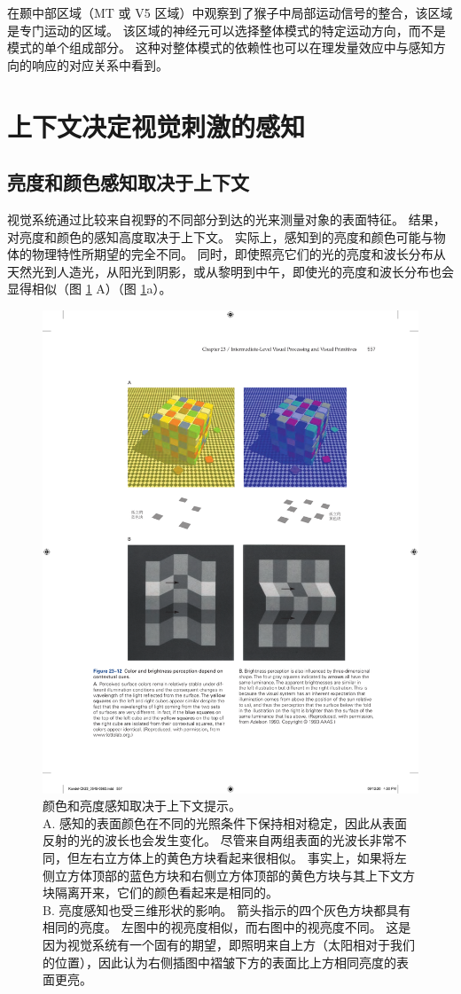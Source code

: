 在颞中部区域（MT 或 V5 区域）中观察到了猴子中局部运动信号的整合，该区域是专门运动的区域。
该区域的神经元可以选择整体模式的特定运动方向，而不是模式的单个组成部分。
这种对整体模式的依赖性也可以在理发量效应中与感知方向的响应的对应关系中看到。



\section{上下文决定视觉刺激的感知}

\subsection{亮度和颜色感知取决于上下文}

视觉系统通过比较来自视野的不同部分到达的光来测量对象的表面特征。
结果，对亮度和颜色的感知高度取决于上下文。 
实际上，感知到的亮度和颜色可能与物体的物理特性所期望的完全不同。
同时，即使照亮它们的光的亮度和波长分布从天然光到人造光，从阳光到阴影，或从黎明到中午，即使光的亮度和波长分布也会显得相似（图 \ref{fig:23_12} A）（图 \ref{fig:23_12}a）。

\begin{figure}[htbp]
	\centering
	\includegraphics[width=0.7\linewidth]{chap23/fig_23_12}
	\caption{颜色和亮度感知取决于上下文提示。\protect\\
		A. 感知的表面颜色在不同的光照条件下保持相对稳定，因此从表面反射的光的波长也会发生变化。
		尽管来自两组表面的光波长非常不同，但左右立方体上的黄色方块看起来很相似。
		事实上，如果将左侧立方体顶部的蓝色方块和右侧立方体顶部的黄色方块与其上下文方块隔离开来，它们的颜色看起来是相同的。\protect\\
		B. 亮度感知也受三维形状的影响。
		箭头指示的四个灰色方块都具有相同的亮度。
		左图中的视亮度相似，而右图中的视亮度不同。
		这是因为视觉系统有一个固有的期望，即照明来自上方（太阳相对于我们的位置），因此认为右侧插图中褶皱下方的表面比上方相同亮度的表面更亮\cite{adelson1993perceptual}。}
	\label{fig:23_12}
\end{figure}


